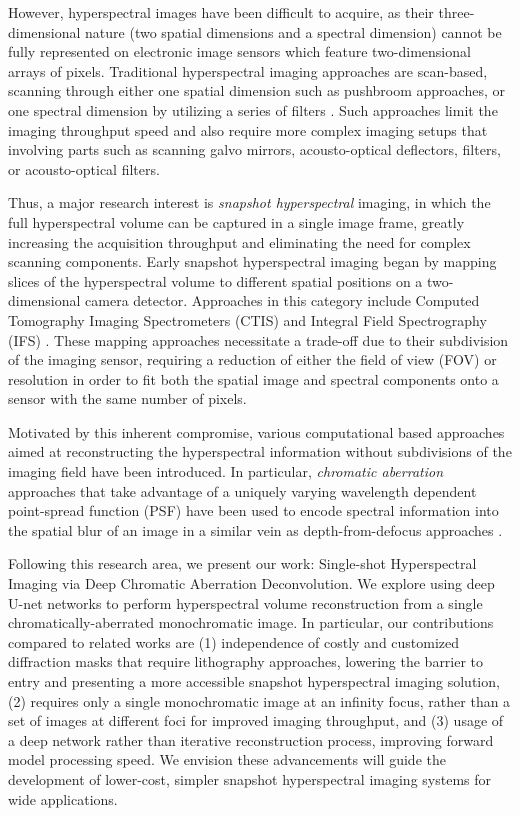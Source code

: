 \documentclass{article}
\begin{document}
However, hyperspectral images have been difficult to acquire, as their three-dimensional nature (two spatial dimensions and a spectral dimension) cannot be fully represented on electronic image sensors which feature two-dimensional arrays of pixels. Traditional hyperspectral imaging approaches are scan-based, scanning through either one spatial dimension such as pushbroom approaches, or one spectral dimension by utilizing a series of filters \cite{gao2015optical}. Such approaches limit the imaging throughput speed and also require more complex imaging setups that involving parts such as scanning galvo mirrors, acousto-optical deflectors, filters, or acousto-optical filters.

Thus, a major research interest is \textit{snapshot hyperspectral} imaging, in which the full hyperspectral volume can be captured in a single image frame, greatly increasing the acquisition throughput and eliminating the need for complex scanning components. Early snapshot hyperspectral imaging began by mapping slices of the hyperspectral volume to different spatial positions on a two-dimensional camera detector. Approaches in this category include Computed Tomography Imaging Spectrometers (CTIS) \cite{FORD2001986} and Integral Field Spectrography (IFS) \cite{allington2006basic}. These mapping approaches necessitate a trade-off due to their subdivision of the imaging sensor, requiring a reduction of either the field of view (FOV) or resolution in order to fit both the spatial image and spectral components onto a sensor with the same number of pixels.

Motivated by this inherent compromise, various computational based approaches aimed at reconstructing the hyperspectral information without subdivisions of the imaging field have been introduced. In particular, \textit{chromatic aberration} approaches that take advantage of a uniquely varying wavelength dependent point-spread function (PSF) have been used to encode spectral information into the spatial blur of an image \cite{zhan2019hyperspectral,baek2021single,jeon2019compact} in a similar vein as depth-from-defocus approaches \cite{ming2021deep}.

Following this research area, we present our work: Single-shot Hyperspectral Imaging via Deep
Chromatic Aberration Deconvolution. We explore using deep U-net networks to perform hyperspectral volume reconstruction from a single chromatically-aberrated monochromatic image. In particular, our contributions compared to related works are (1) independence of costly and customized diffraction masks that require lithography approaches, lowering the barrier to entry and presenting a more accessible snapshot hyperspectral imaging solution, (2) requires only a single monochromatic image at an infinity focus, rather than a set of images at different foci for improved imaging throughput, and (3) usage of a deep network rather than iterative reconstruction process, improving forward model processing speed. We envision these advancements will guide the development of lower-cost, simpler snapshot hyperspectral imaging systems for wide applications.
\end{document}
